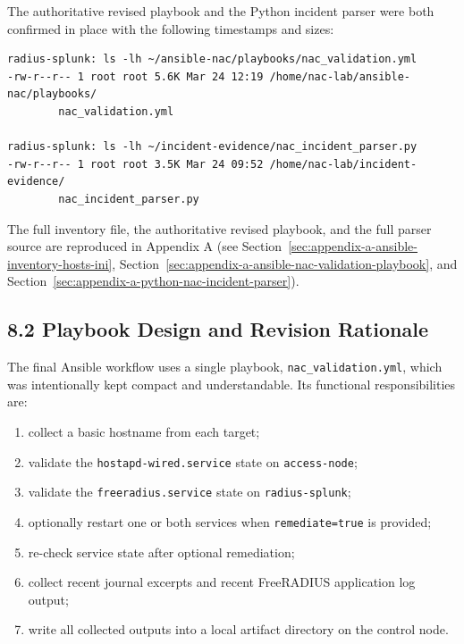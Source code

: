 \documentclass[11pt]{article}
\begin{document}
The authoritative revised playbook and the Python incident parser were both confirmed in place with the following timestamps and sizes:

\begin{verbatim}
radius-splunk: ls -lh ~/ansible-nac/playbooks/nac_validation.yml
-rw-r--r-- 1 root root 5.6K Mar 24 12:19 /home/nac-lab/ansible-nac/playbooks/
        nac_validation.yml

radius-splunk: ls -lh ~/incident-evidence/nac_incident_parser.py
-rw-r--r-- 1 root root 3.5K Mar 24 09:52 /home/nac-lab/incident-evidence/
        nac_incident_parser.py
\end{verbatim}

The full inventory file, the authoritative revised playbook, and the full parser source are reproduced in Appendix A (see Section~\ref{sec:appendix-a-ansible-inventory-hosts-ini}, Section~\ref{sec:appendix-a-ansible-nac-validation-playbook}, and Section~\ref{sec:appendix-a-python-nac-incident-parser}).


\subsection{8.2 Playbook Design and Revision Rationale}
\label{sec:playbook-design-and-revision-rationale}

The final Ansible workflow uses a single playbook, \texttt{nac\_validation.yml}, which was intentionally kept compact and understandable. Its functional responsibilities are:

\begin{enumerate}
    \item collect a basic hostname from each target;
    \item validate the \texttt{hostapd-wired.service} state on \texttt{access-node};
    \item validate the \texttt{freeradius.service} state on \texttt{radius-splunk};
    \item optionally restart one or both services when \texttt{remediate=true} is provided;
    \item re-check service state after optional remediation;
    \item collect recent journal excerpts and recent FreeRADIUS application log output;
    \item write all collected outputs into a local artifact directory on the control node.
\end{enumerate}
\end{document}
